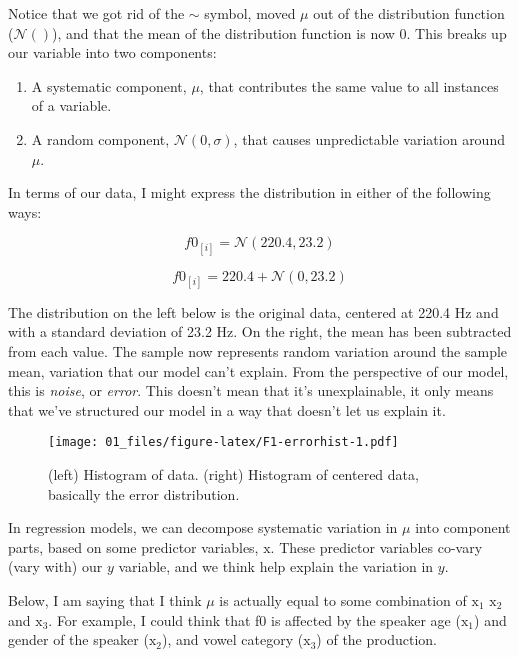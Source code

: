 \documentclass[
]{book}
\begin{document}
Notice that we got rid of the \(\sim\) symbol, moved \(\mu\) out of the distribution function (\(\mathcal{N}()\)), and that the mean of the distribution function is now 0. This breaks up our variable into two components:

\begin{enumerate}
\def\labelenumi{\arabic{enumi})}
\item
  A systematic component, \(\mu\), that contributes the same value to all instances of a variable.
\item
  A random component, \(\mathcal{N}(0,\sigma)\), that causes unpredictable variation around \(\mu\).
\end{enumerate}

In terms of our data, I might express the distribution in either of the following ways:

\[
f0_{[i]} = \mathcal{N}(220.4,23.2)
\label{eq:3}
\]

\[
f0_{[i]} = 220.4 + \mathcal{N}(0,23.2)
\label{eq:4}
\]

The distribution on the left below is the original data, centered at 220.4 Hz and with a standard deviation of 23.2 Hz. On the right, the mean has been subtracted from each value. The sample now represents random variation around the sample mean, variation that our model can't explain. From the perspective of our model, this is \emph{noise}, or \emph{error}. This doesn't mean that it's unexplainable, it only means that we've structured our model in a way that doesn't let us explain it.

\begin{figure}
\centering
\texttt{[image: 01\_files/figure-latex/F1-errorhist-1.pdf]}
\caption{\label{fig:F1-errorhist}(left) Histogram of data. (right) Histogram of centered data, basically the error distribution.}
\end{figure}

In regression models, we can decompose systematic variation in \(\mu\) into component parts, based on some predictor variables, \(\mathrm{x}\). These predictor variables co-vary (vary with) our \(y\) variable, and we think help explain the variation in \(y\).

Below, I am saying that I think \(\mu\) is actually equal to some combination of \(\mathrm{x}_{1}\) \(\mathrm{x}_{2}\) and \(\mathrm{x}_{3}\). For example, I could think that f0 is affected by the speaker age (\(\mathrm{x}_{1}\)) and gender of the speaker (\(\mathrm{x}_{2}\)), and vowel category (\(\mathrm{x}_{3}\)) of the production.
\end{document}
